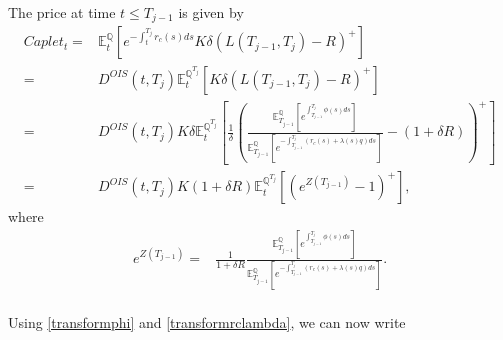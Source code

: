 \documentclass[12pt,a4paper]{article}
\theoremstyle{plain}
\numberwithin{equation}{section}
\begin{document}
The price at time $t\leq T_{j-1}$ is given by
\begin{align}
Caplet_t=&\mathbb{E}_t^\mathbb{Q}\left[e^{-\int_{t}^{T_j}r_c(s)ds}K\delta\left(L(T_{j-1},T_j)-R\right)^+\right]\nonumber\\
=& D^{OIS}(t,T_j)\mathbb{E}_t^{\mathbb{Q}^{T_j}}\left[K\delta\left(L(T_{j-1},T_j)-R\right)^+\right]\nonumber\\
=& D^{OIS}(t,T_j)K\delta\mathbb{E}_t^{\mathbb{Q}^{T_j}}\left[
\frac{1}{\delta}\left(\frac{\mathbb{E}_{T_{j-1}}^\mathbb{Q}\left[e^{\int_{T_{j-1}}^{T_{j}}\phi(s)ds}\right]}{\mathbb{E}_{T_{j-1}}^\mathbb{Q}
\left[e^{-\int_{T_{j-1}}^{T_{j}}(r_c(s)+\lambda(s)q)ds}\right]}-{\left( 1+\delta R\right)}\right)^+\right]\nonumber\\
=& D^{OIS}(t,T_j)K\left( 1+\delta R\right)\mathbb{E}_t^{\mathbb{Q}^{T_j}}\left[\left(
e^{Z (T_{j-1})}-1\right)^+\right],\label{Cap}
\end{align}
where
\begin{align}
e^{Z (T_{j-1})}=& \frac{1}{1+\delta R}\frac{\mathbb{E}_{T_{j-1}}^\mathbb{Q}\left[e^{\int_{T_{j-1}}^{T_{j}}\phi(s)ds}\right]}{\mathbb{E}_{T_{j-1}}^\mathbb{Q}\left[e^{-\int_{T_{j-1}}^{T_{j}}(r_c(s)+\lambda(s)q)ds}\right]}\label{Z}.\\
\end{align}

Using \eqref{transformphi} and \eqref{transformrclambda}, we can now write
\end{document}
